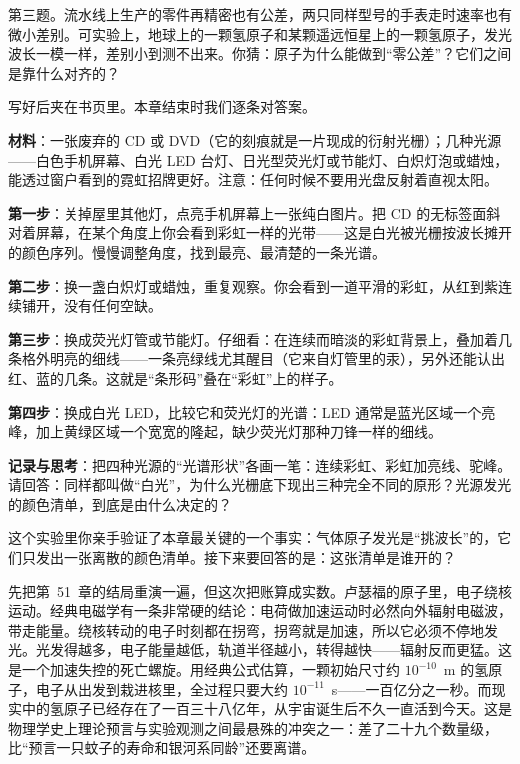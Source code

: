 第三题。流水线上生产的零件再精密也有公差，两只同样型号的手表走时速率也有微小差别。可实验上，地球上的一颗氢原子和某颗遥远恒星上的一颗氢原子，发光波长一模一样，差别小到测不出来。你猜：原子为什么能做到“零公差”？它们之间是靠什么对齐的？

写好后夹在书页里。本章结束时我们逐条对答案。


\begin{experiment}
\textbf{材料}：一张废弃的 CD 或 DVD（它的刻痕就是一片现成的衍射光栅）；几种光源——白色手机屏幕、白光 LED 台灯、日光型荧光灯或节能灯、白炽灯泡或蜡烛，能透过窗户看到的霓虹招牌更好。注意：任何时候不要用光盘反射着直视太阳。

\textbf{第一步}：关掉屋里其他灯，点亮手机屏幕上一张纯白图片。把 CD 的无标签面斜对着屏幕，在某个角度上你会看到彩虹一样的光带——这是白光被光栅按波长摊开的颜色序列。慢慢调整角度，找到最亮、最清楚的一条光谱。

\textbf{第二步}：换一盏白炽灯或蜡烛，重复观察。你会看到一道平滑的彩虹，从红到紫连续铺开，没有任何空缺。

\textbf{第三步}：换成荧光灯管或节能灯。仔细看：在连续而暗淡的彩虹背景上，叠加着几条格外明亮的细线——一条亮绿线尤其醒目（它来自灯管里的汞），另外还能认出红、蓝的几条。这就是“条形码”叠在“彩虹”上的样子。

\textbf{第四步}：换成白光 LED，比较它和荧光灯的光谱：LED 通常是蓝光区域一个亮峰，加上黄绿区域一个宽宽的隆起，缺少荧光灯那种刀锋一样的细线。

\textbf{记录与思考}：把四种光源的“光谱形状”各画一笔：连续彩虹、彩虹加亮线、驼峰。请回答：同样都叫做“白光”，为什么光栅底下现出三种完全不同的原形？光源发光的颜色清单，到底是由什么决定的？
\end{experiment}

这个实验里你亲手验证了本章最关键的一个事实：气体原子发光是“挑波长”的，它们只发出一张离散的颜色清单。接下来要回答的是：这张清单是谁开的？


先把第~51~章的结局重演一遍，但这次把账算成实数。卢瑟福的原子里，电子绕核运动。经典电磁学有一条非常硬的结论：电荷做加速运动时必然向外辐射电磁波，带走能量。绕核转动的电子时刻都在拐弯，拐弯就是加速，所以它必须不停地发光。光发得越多，电子能量越低，轨道半径越小，转得越快——辐射反而更猛。这是一个加速失控的死亡螺旋。用经典公式估算，一颗初始尺寸约 \(10^{-10}\)~m 的氢原子，电子从出发到栽进核里，全过程只要大约 \(10^{-11}\)~s——一百亿分之一秒。而现实中的氢原子已经存在了一百三十八亿年，从宇宙诞生后不久一直活到今天。这是物理学史上理论预言与实验观测之间最悬殊的冲突之一：差了二十九个数量级，比“预言一只蚊子的寿命和银河系同龄”还要离谱。

